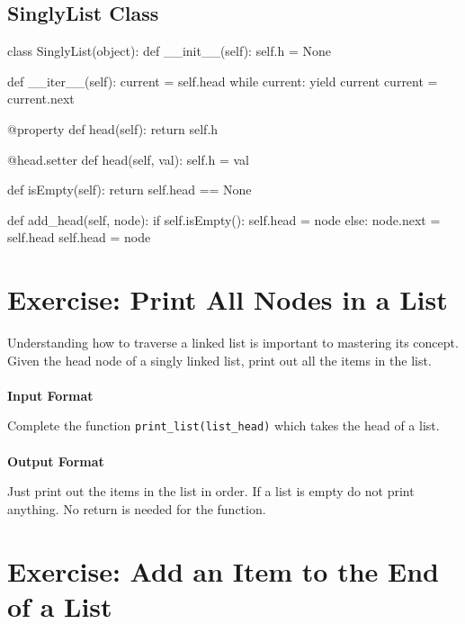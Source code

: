 \documentclass{42-en}
\begin{document}
    \section{SinglyList Class}

    	\begin{42pycode}
class SinglyList(object):
	def __init__(self):
		self.h = None

	def __iter__(self):
		current = self.head
		while current:
			yield current
			current = current.next

	@property
	def head(self):
		return self.h

	@head.setter
	def head(self, val):
		self.h = val

	def isEmpty(self):
		return self.head == None

	def add_head(self, node):
		if self.isEmpty():
			self.head = node
		else:
			node.next = self.head
			self.head = node
	\end{42pycode}

\startexercices

\chapter{Exercise\exercicenumber: Print All Nodes in a List}

\exnumber{\exercicenumber}

\makeheaderfiles
    Understanding how to traverse a linked list is important to mastering
    its concept. Given the head node of a singly linked list, print out all
    the items in the list.
    \\
    \\
    \textbf{Input Format}

    Complete the function \texttt{print\_list(list\_head)} which takes the head of a list.
    \\
    \\
    \textbf{Output Format}

    Just print out the items in the list in order. If a list is empty do 
    not print anything. No return is needed for the function.

\nextexercice

\chapter{Exercise\exercicenumber: Add an Item to the End of a List}
\end{document}
